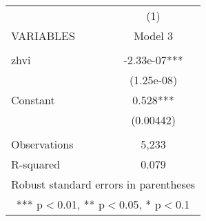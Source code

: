 \documentclass[]{article}
\begin{document}
\begin{tabular}{lc} \hline
 & (1) \\
VARIABLES & Model 3 \\ \hline
 &  \\
zhvi & -2.33e-07*** \\
 & (1.25e-08) \\
Constant & 0.528*** \\
 & (0.00442) \\
 &  \\
Observations & 5,233 \\
 R-squared & 0.079 \\ \hline
\multicolumn{2}{c}{ Robust standard errors in parentheses} \\
\multicolumn{2}{c}{ *** p$<$0.01, ** p$<$0.05, * p$<$0.1} \\
\end{tabular}
\end{document}
